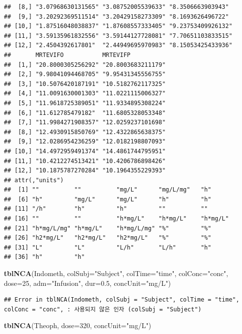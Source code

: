 \documentclass[]{krantz}
\makeatletter
\newenvironment{Shaded}{\begin{snugshade}}{\end{snugshade}}
\newcommand{\KeywordTok}[1]{\textcolor[rgb]{0.13,0.29,0.53}{\textbf{#1}}}
\newcommand{\DataTypeTok}[1]{\textcolor[rgb]{0.13,0.29,0.53}{#1}}
\newcommand{\DecValTok}[1]{\textcolor[rgb]{0.00,0.00,0.81}{#1}}
\newcommand{\FloatTok}[1]{\textcolor[rgb]{0.00,0.00,0.81}{#1}}
\newcommand{\StringTok}[1]{\textcolor[rgb]{0.31,0.60,0.02}{#1}}
\newcommand{\NormalTok}[1]{#1}
\newenvironment{kframe}{%
\medskip{}
\setlength{\fboxsep}{.8em}
 \def\at@end@of@kframe{}%
 \ifinner\ifhmode%
  \def\at@end@of@kframe{\end{minipage}}%
  \begin{minipage}{\columnwidth}%
 \fi\fi%
 \def\FrameCommand##1{\hskip\@totalleftmargin \hskip-\fboxsep
 \colorbox{shadecolor}{##1}\hskip-\fboxsep
     \hskip-\linewidth \hskip-\@totalleftmargin \hskip\columnwidth}%
 \MakeFramed {\advance\hsize-\width
   \@totalleftmargin\z@ \linewidth\hsize
   \@setminipage}}%
 {\par\unskip\endMakeFramed%
 \at@end@of@kframe}
\renewenvironment{Shaded}{\begin{kframe}}{\end{kframe}}
\theoremstyle{definition}
\theoremstyle{definition}
\theoremstyle{definition}
\theoremstyle{remark}
\makeatother
\begin{document}
\begin{verbatim}
##  [8,] "3.07968630131565" "3.08752005539633" "8.3506663903943" 
##  [9,] "3.20292369511514" "3.20429158273309" "8.1693626496722" 
## [10,] "1.87516048038837" "1.87608557333405" "9.23753409926132"
## [11,] "3.59135961832556" "3.59144127728081" "7.70651103833515"
## [12,] "2.4504392617801"  "2.44949695970983" "8.15053425433936"
##       MRTEVIFO           MRTEVIFP          
##  [1,] "20.8000305256292" "20.8003683211179"
##  [2,] "9.98041094468705" "9.95431345556755"
##  [3,] "10.5076420187191" "10.5182762117325"
##  [4,] "11.0091630001303" "11.0221115006327"
##  [5,] "11.9618725389051" "11.9334895308224"
##  [6,] "11.612785479182"  "11.6805328053348"
##  [7,] "11.9984271908357" "12.0259237101698"
##  [8,] "12.4930915850769" "12.4322865638375"
##  [9,] "12.0286954236259" "12.0182198807093"
## [10,] "14.4972959491374" "14.4861744795951"
## [11,] "10.4212274513421" "10.4206786898426"
## [12,] "10.1875787270284" "10.1964355229393"
## attr(,"units")
##  [1] ""          ""          "mg/L"      "mg/L/mg"   "h"        
##  [6] "h"         "mg/L"      "mg/L"      "h"         "h"        
## [11] "/h"        "h"         "h"         ""          ""         
## [16] ""          ""          "h*mg/L"    "h*mg/L"    "h*mg/L"   
## [21] "h*mg/L/mg" "h*mg/L"    "h*mg/L/mg" "%"         "%"        
## [26] "h2*mg/L"   "h2*mg/L"   "h2*mg/L"   "%"         "%"        
## [31] "L"         "L"         "L/h"       "L/h"       "h"        
## [36] "h"         "h"
\end{verbatim}

\begin{Shaded}
\begin{Highlighting}[]
\KeywordTok{tblNCA}\NormalTok{(Indometh, }\DataTypeTok{colSubj=}\StringTok{"Subject"}\NormalTok{, }\DataTypeTok{colTime=}\StringTok{"time"}\NormalTok{, }\DataTypeTok{colConc=}\StringTok{"conc"}\NormalTok{, }\DataTypeTok{dose=}\DecValTok{25}\NormalTok{,}
       \DataTypeTok{adm=}\StringTok{"Infusion"}\NormalTok{, }\DataTypeTok{dur=}\FloatTok{0.5}\NormalTok{, }\DataTypeTok{concUnit=}\StringTok{"mg/L"}\NormalTok{)}
\end{Highlighting}
\end{Shaded}

\begin{verbatim}
## Error in tblNCA(Indometh, colSubj = "Subject", colTime = "time", colConc = "conc", : 사용되지 않은 인자 (colSubj = "Subject")
\end{verbatim}

\begin{Shaded}
\begin{Highlighting}[]
\KeywordTok{tblNCA}\NormalTok{(Theoph, }\DataTypeTok{dose=}\DecValTok{320}\NormalTok{, }\DataTypeTok{concUnit=}\StringTok{"mg/L"}\NormalTok{)}
\end{Highlighting}
\end{Shaded}
\end{document}
